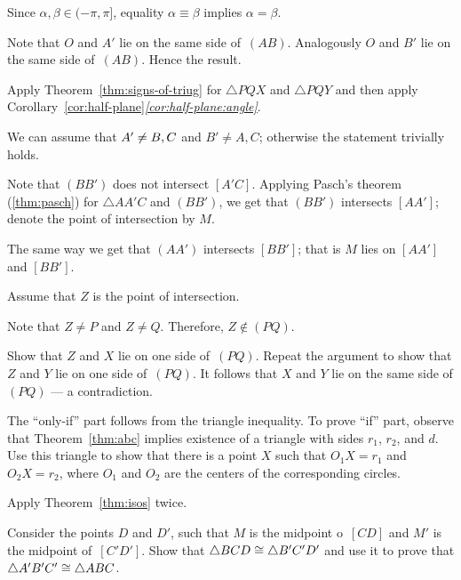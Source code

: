 Since $\alpha,\beta\in(-\pi,\pi]$, equality $\alpha\equiv \beta$ implies $\alpha= \beta$.

Note that $O$ and $A'$
lie on the same side of~$(AB)$.
Analogously $O$ and $B'$
lie on the same side of~$(AB)$.
Hence the result.

Apply Theorem~\ref{thm:signs-of-triug} for $\triangle PQX$ and $\triangle PQY$ and then 
apply Corollary~\ref{cor:half-plane}\textit{\ref{cor:half-plane:angle}}.

We can assume that $A'\z\ne B,C$ and $B'\ne A, C$;
otherwise the statement trivially holds.

Note that $(BB')$ does not intersect $[A'C]$.
Applying Pasch's theorem (\ref{thm:pasch}) for $\triangle AA'C$ and $(BB')$, we get that 
$(BB')$ intersects $[AA']$; denote the point of intersection by $M$.

The same way we get that $(AA')$ intersects $[BB']$;
that is $M$ lies on $[AA']$ and $[BB']$.

Assume that $Z$ is the point of intersection.

Note that $Z\ne P$ and $Z\ne Q$.
Therefore, $Z\notin (PQ)$.

Show that $Z$ and $X$ lie on one side of~$(PQ)$.
Repeat the argument to show that $Z$ and $Y$ lie on one side of~$(PQ)$.
It follows that $X$ and $Y$ lie on the same side of $(PQ)$ --- a contradiction.

 The ``only-if'' part follows from the triangle inequality.
To prove ``if'' part,  
observe that Theorem~\ref{thm:abc} implies existence of a triangle with sides $r_1$, $r_2$, and $d$.
Use this triangle to show that there is a point $X$ such that $O_1X=r_1$ and $O_2X=r_2$, where $O_1$ and $O_2$ are the centers of the corresponding circles.



\setcounter{eqtn}{0}

Apply Theorem~\ref{thm:isos} twice.

Consider the points $D$ and $D'$, such that 
$M$ is the midpoint o~$[CD]$
and 
$M'$ is the midpoint of~$[C'D']$.
Show that $\triangle BCD\z\cong \triangle B'C'D'$ and use it to prove that $\triangle A' B' C'\z\cong\triangle A B C$.

